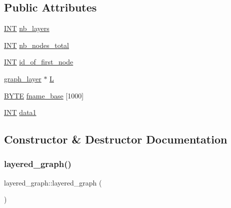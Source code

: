 \subsection*{Public Attributes}
\begin{DoxyCompactItemize}
\item 
\mbox{\hyperlink{galois_8h_a09fddde158a3a20bd2dcadb609de11dc}{I\+NT}} \mbox{\hyperlink{classlayered__graph_a902d543943821786b2f2bff5d776b0cd}{nb\+\_\+layers}}
\item 
\mbox{\hyperlink{galois_8h_a09fddde158a3a20bd2dcadb609de11dc}{I\+NT}} \mbox{\hyperlink{classlayered__graph_a459fd6ca3b0f6f6943adca6f30986440}{nb\+\_\+nodes\+\_\+total}}
\item 
\mbox{\hyperlink{galois_8h_a09fddde158a3a20bd2dcadb609de11dc}{I\+NT}} \mbox{\hyperlink{classlayered__graph_aa738bb882e2c4b35ead77eb4777f58ee}{id\+\_\+of\+\_\+first\+\_\+node}}
\item 
\mbox{\hyperlink{classgraph__layer}{graph\+\_\+layer}} $\ast$ \mbox{\hyperlink{classlayered__graph_a96d0e46ee39b44323a1c25a6c9826f27}{L}}
\item 
\mbox{\hyperlink{galois_8h_ab6cc7b4aeb6ea31aba2b3fbfc83ff5e6}{B\+Y\+TE}} \mbox{\hyperlink{classlayered__graph_a4f2e41c956d3605418eb0f5975917c1c}{fname\+\_\+base}} \mbox{[}1000\mbox{]}
\item 
\mbox{\hyperlink{galois_8h_a09fddde158a3a20bd2dcadb609de11dc}{I\+NT}} \mbox{\hyperlink{classlayered__graph_a4d306549afff70ae54e9acb93fedec82}{data1}}
\end{DoxyCompactItemize}


\subsection{Constructor \& Destructor Documentation}
\mbox{\label{classlayered__graph_a4376cdc81ba893f988b1b6e96e8f6c97}} 
\subsubsection{\texorpdfstring{layered\+\_\+graph()}{layered\_graph()}}
{\footnotesize\ttfamily layered\+\_\+graph\+::layered\+\_\+graph (\begin{DoxyParamCaption}{ }\end{DoxyParamCaption})}

